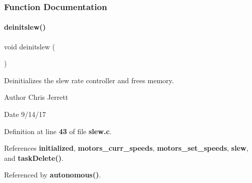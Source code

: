 \subsubsection{Function Documentation}
\mbox{\label{slew_8c_a981c9990a969d2587e66e550737f7cd9}} 
\paragraph{deinitslew()}
{\footnotesize\ttfamily void deinitslew (\begin{DoxyParamCaption}{ }\end{DoxyParamCaption})}



Deinitializes the slew rate controller and frees memory. 

\begin{DoxyAuthor}{Author}
Chris Jerrett 
\end{DoxyAuthor}
\begin{DoxyDate}{Date}
9/14/17 
\end{DoxyDate}


Definition at line \textbf{ 43} of file \textbf{ slew.\+c}.



References \textbf{ initialized}, \textbf{ motors\+\_\+curr\+\_\+speeds}, \textbf{ motors\+\_\+set\+\_\+speeds}, \textbf{ slew}, and \textbf{ task\+Delete()}.



Referenced by \textbf{ autonomous()}.



